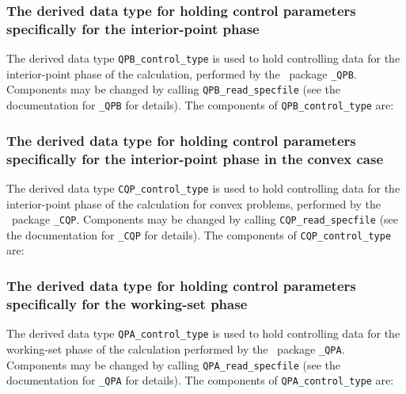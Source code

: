 \documentclass{galahad}
\begin{document}

\subsubsection{The derived data type for holding control 
 parameters specifically for the interior-point phase}\label{typeqpbcontrol}
The derived data type 
{\tt QPB\_control\_type} 
is used to hold controlling data for the interior-point phase of the calculation,
performed by the \libraryname\ package {\tt \libraryname\_QPB}. 
Components may be changed by calling 
{\tt QPB\_read\-\_specfile}
(see the documentation for {\tt \libraryname\_QPB}
for details). The components of 
{\tt QPB\_control\_type} 
are:




\subsubsection{The derived data type for holding control 
 parameters specifically for the interior-point phase in the convex case}\label{typecqpcontrol}
The derived data type 
{\tt CQP\_control\_type} 
is used to hold controlling data for the interior-point phase of the 
calculation for convex problems, 
performed by the \libraryname\ package {\tt \libraryname\_CQP}. 
Components may be changed by calling 
{\tt CQP\_read\-\_specfile}
(see the documentation for {\tt \libraryname\_CQP}
for details). The components of 
{\tt CQP\_control\_type} 
are:




\subsubsection{The derived data type for holding control 
 parameters specifically for the working-set phase}\label{typeqpacontrol}
The derived data type 
{\tt QPA\_control\_type} 
is used to hold controlling data for the working-set phase of the
calculation performed by the \libraryname\ package {\tt \libraryname\_QPA}. 
Components may be changed by calling 
{\tt QPA\_read\-\_specfile}
(see the documentation for {\tt \libraryname\_QPA}
for details). The components of 
{\tt QPA\_control\_type} 
are:


\end{document}
